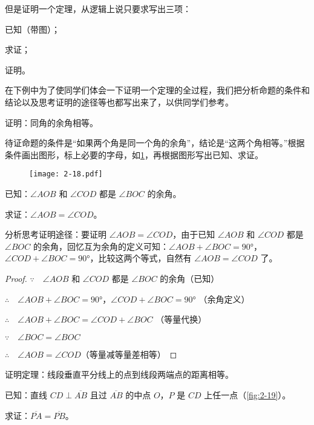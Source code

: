 但是证明一个定理，从逻辑上说只要求写出三项：
\begin{enumerate*}
	\item 已知（带图）；
	\item 求证；
	\item 证明。
\end{enumerate*}

在下例中为了使同学们体会一下证明一个定理的全过程，我们把分析命题的条件和结论以及思考证明的途径等也都写出来了，以供同学们参考。

\begin{example}
	证明：同角的余角相等。
	
	待证命题的条件是“如果两个角是同一个角的余角”，结论是“这两个角相等。”根据条件画出图形，标上必要的字母，如\cref{fig:2-18}，再根据图形写出已知、求证。
\end{example}

\begin{figure}
  \texttt{[image: 2-18.pdf]}
	\caption{}\label{fig:2-18}
\end{figure}

已知：$\angle AOB$ 和 $\angle COD$ 都是 $\angle BOC$ 的余角。

求证：$\angle AOB=\angle COD$。

分析思考证明途径：要证明 $\angle AOB=\angle COD$，由于已知 $\angle AOB$ 和 $\angle COD$ 都是 $\angle BOC$ 的余角，回忆互为余角的定义可知：$\angle AOB+\angle BOC=\ang{90}$，$\angle COD+\angle BOC=\ang{90}$，比较这两个等式，自然有 $\angle AOB=\angle COD$ 了。

\begin{proof}
$\because\quad \angle AOB$ 和 $\angle COD$ 都是 $\angle BOC$ 的余角（已知）

$\therefore\quad \angle AOB+\angle BOC=\ang{90}$，$\angle COD+\angle BOC=\ang{90}$ （余角定义）

$\therefore\quad \angle AOB+\angle BOC=\angle COD+\angle BOC$ （等量代换）

$\because\quad \angle BOC=\angle BOC$

$\therefore\quad \angle AOB=\angle COD$（等量减等量差相等）	
\end{proof}

\begin{example}
证明定理：线段垂直平分线上的点到线段两端点的距离相等。

已知：直线 $CD\perp\overline{AB}$ 且过 $\overline{AB}$ 的中点 $O$，$P$ 是 $CD$ 上任一点（\cref{fig:2-19}）。

求证：$\overline{PA}=\overline{PB}$。
\end{example}

